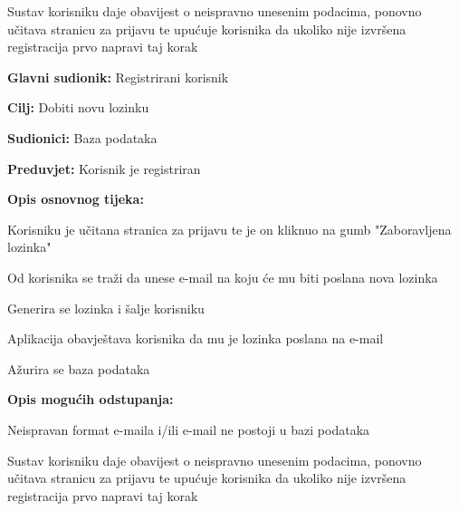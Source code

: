 \begin{packed_item}
\begin{packed_item}
\begin{packed_enum}
								\item Sustav korisniku daje obavijest o neispravno unesenim podacima, ponovno učitava stranicu za prijavu te upućuje korisnika da ukoliko nije izvršena registracija prvo napravi taj korak
								
							\end{packed_enum}
							
						\end{packed_item}
			
					\end{packed_item}
				\noindent {}
				\begin{packed_item}
					
					\item \textbf{Glavni sudionik: } Registrirani korisnik
					\item  \textbf{Cilj:} Dobiti novu lozinku
					\item  \textbf{Sudionici:} Baza podataka
					\item  \textbf{Preduvjet:} Korisnik je registriran
					\item  \textbf{Opis osnovnog tijeka:}
					
					\item[] \begin{packed_enum}
				
						\item Korisniku je učitana stranica za prijavu te je on kliknuo na gumb "Zaboravljena lozinka"
						\item Od korisnika se traži da unese e-mail na koju će mu biti poslana nova lozinka
						\item Generira se lozinka i šalje korisniku
						\item Aplikacija obavještava korisnika da mu je lozinka poslana na e-mail
						\item Ažurira se baza podataka
						
					\end{packed_enum}
					
					\item  \textbf{Opis mogućih odstupanja:}
					
					\item[] \begin{packed_item}
						
						\item[2.a]  Neispravan format e-maila i/ili e-mail ne postoji u bazi podataka
						\item[] \begin{packed_enum}
							
							\item Sustav korisniku daje obavijest o neispravno unesenim podacima, ponovno učitava stranicu za prijavu te upućuje korisnika da ukoliko nije izvršena registracija prvo napravi taj korak
							
						\end{packed_enum}
						
					\end{packed_item}
					
				\end{packed_item}

